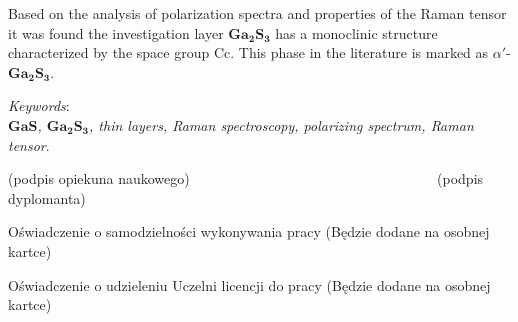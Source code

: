 Based on the analysis of polarization spectra and properties of the Raman tensor it was found the investigation layer $\mathbf{Ga_{2}S_{3}}$ has a monoclinic structure characterized by the space group Cc. This phase in the literature is marked as $\alpha'$-$\mathbf{Ga_{2}S_{3}}$.

\vspace{10mm}

\textit{Keywords}: \\
\textit{$\mathbf{GaS}$, $\mathbf{Ga_{2}S_{3}}$, thin layers, Raman spectroscopy, polarizing spectrum, Raman tensor}.

\vspace{30mm}

(podpis opiekuna naukowego) \textcolor{white}{---------------------------------------------------} (podpis dyplomanta)

\newpage

Oświadczenie o samodzielności wykonywania pracy (Będzie dodane na osobnej kartce)

\newpage

Oświadczenie o udzieleniu Uczelni licencji do pracy (Będzie dodane na osobnej kartce)

\newpage